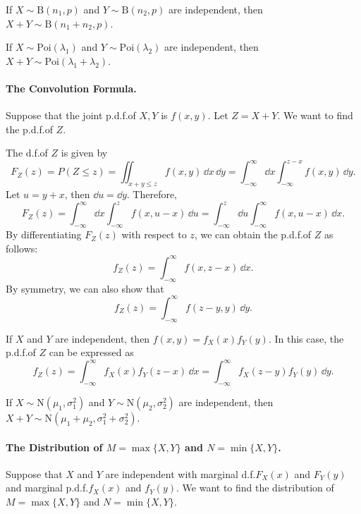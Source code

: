 \begin{proposition}
  If \(X \sim \mathrm{B}(n_1, p)\) and \(Y \sim \mathrm{B}(n_2, p)\) are independent, then \(X + Y \sim \mathrm{B}(n_1 + n_2, p)\).
\end{proposition}

\begin{proposition}
  If \(X \sim \mathrm{Poi}(\lambda_1)\) and \(Y \sim \mathrm{Poi}(\lambda_2)\) are independent, then \(X + Y \sim \mathrm{Poi}(\lambda_1 + \lambda_2)\).
\end{proposition}

\paragraph{The Convolution Formula.}
Suppose that the joint p.d.f.\@ of \(X, Y\) is \(f(x, y)\). Let \(Z = X + Y\). We want to find the p.d.f.\@ of \(Z\).

The d.f.\@ of \(Z\) is given by
\[
  F_Z(z) = P(Z \leq z) = \iint_{x + y \leq z} f(x, y) \, \dd x \, \dd y = \int_{-\infty}^\infty \dd x \int_{-\infty}^{z - x} f(x, y) \, \dd y.
\]
Let \(u = y + x\), then \(\dd u = \dd y\). Therefore,
\[
  F_Z(z) = \int_{-\infty}^\infty \dd x \int_{-\infty}^{z} f(x, u - x) \, \dd u = \int_{-\infty}^z \dd u \int_{-\infty}^\infty f(x, u - x) \, \dd x.
\]
By differentiating \(F_Z(z)\) with respect to \(z\), we can obtain the p.d.f.\@ of \(Z\) as follows:
\[
  f_Z(z) = \int_{-\infty}^\infty f(x, z - x) \, \dd x.
\]
By symmetry, we can also show that
\[
  f_Z(z) = \int_{-\infty}^\infty f(z - y, y) \, \dd y.
\]

If \(X\) and \(Y\) are independent, then \(f(x, y) = f_X(x) f_Y(y)\). In this case, the p.d.f.\@ of \(Z\) can be expressed as
\[
  f_Z(z) = \int_{-\infty}^\infty f_X(x) f_Y(z - x) \, \dd x = \int_{-\infty}^\infty f_X(z - y) f_Y(y) \, \dd y.
\]

\begin{proposition}
  If \(X \sim \mathrm{N}(\mu_1, \sigma_1^2)\) and \(Y \sim \mathrm{N}(\mu_2, \sigma_2^2)\) are independent, then \(X + Y \sim \mathrm{N}(\mu_1 + \mu_2, \sigma_1^2 + \sigma_2^2)\).
\end{proposition}

\paragraph{The Distribution of \(M = \max\{X, Y\}\) and \(N = \min\{X, Y\}\).} Suppose that \(X\) and \(Y\) are independent with marginal d.f.\@ \(F_X(x)\) and \(F_Y(y)\) and marginal p.d.f.\@ \(f_X(x)\) and \(f_Y(y)\). We want to find the distribution of \(M = \max\{X, Y\}\) and \(N = \min\{X, Y\}\).

